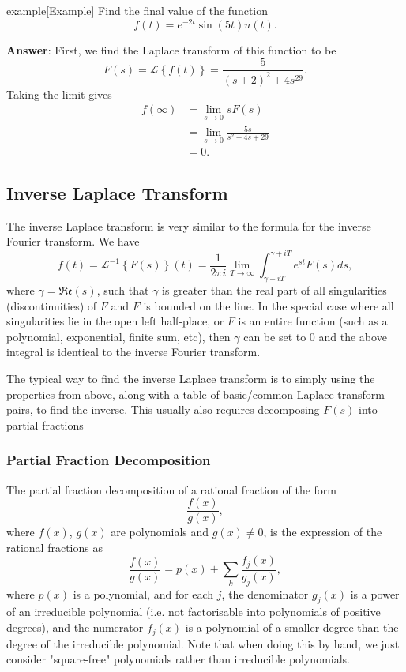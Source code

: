 \documentclass{article}
\begin{document}
\begin{callout}{example}[Example]
\label{example:s4-e1}
Find the final value of the function
\[
    f(t)=e^{-2t}\sin(5t)u(t).
\]

\textbf{Answer}: First, we find the Laplace transform of this function to be
\[
    F(s)=\mathcal{L}\left\{ f(t) \right\}=\frac{5}{(s+2)^2+4s^29}.
\]
Taking the limit gives
\begin{align*}
    f(\infty) &= \lim_{s\to 0} sF(s) \\
              &= \lim_{s\to 0}\frac{5s}{s^2+4s+29} \\
              &= 0.
\end{align*}
\end{callout}

\subsection{Inverse Laplace Transform}
The inverse Laplace transform is very similar to the formula for the inverse Fourier transform. We have
\[
    f(t)=\mathcal{L}^{-1}\left\{ F(s) \right\}(t)=\frac{1}{2\pi i}\lim_{T\to \infty} \int_{\gamma -i T}^{\gamma +i T}e^{st}F(s)ds,
\]
where $\gamma =\mathfrak{Re}(s)$, such that $\gamma $ is greater than the real part of all singularities (discontinuities) of $F$ and $F$ is bounded on the line. In the special case where all singularities lie in the open left half-place, or $F$ is an entire function (such as a polynomial, exponential, finite sum, etc), then $\gamma $ can be set to 0 and the above integral is identical to the inverse Fourier transform.

The typical way to find the inverse Laplace transform is to simply using the properties from above, along with a table of basic/common Laplace transform pairs, to find the inverse. This usually also requires decomposing $F(s)$ into partial fractions

\subsubsection{Partial Fraction Decomposition}
The partial fraction decomposition of a rational fraction of the form
\[
    \frac{f(x)}{g(x)},
\]
where $f(x)$, $g(x)$ are polynomials and $g(x)\neq 0$, is the expression of the rational fractions as
\[
    \frac{f(x)}{g(x)}=p(x)+\sum_{k} \frac{f_j(x)}{g_j(x)},
\]
where $p(x)$ is a polynomial, and for each $j$, the denominator $g_j(x)$ is a power of an irreducible polynomial (i.e. not factorisable into polynomials of positive degrees), and the numerator $f_j(x)$ is a polynomial of a smaller degree than the degree of the irreducible polynomial. Note that when doing this by hand, we just consider "square-free" polynomials rather than irreducible polynomials.
\end{document}
